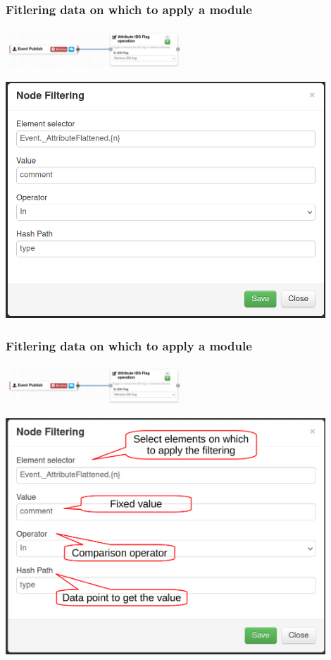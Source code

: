 \begin{frame}
    \frametitle{Fitlering data on which to apply a module}
    \begin{center}
        \includegraphics[width=0.5\textwidth]{pictures/remove-ids-3.png}
    \end{center}
    \begin{center}
        \includegraphics[width=0.9\textwidth]{pictures/remove-ids-2.png}
    \end{center}
\end{frame}

\begin{frame}
    \frametitle{Fitlering data on which to apply a module}
    \begin{center}
        \includegraphics[width=0.5\textwidth]{pictures/remove-ids-3.png}
    \end{center}
    \begin{center}
        \includegraphics[width=0.9\textwidth]{pictures/remove-ids-2-details.png}
    \end{center}
\end{frame}

